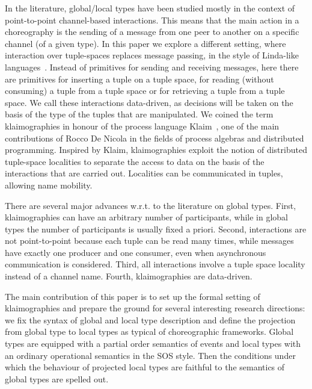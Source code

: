 In the literature, global/local types have been studied mostly in the
context of point-to-point channel-based interactions. This means that
the main action in a choreography is the sending of a message from one
peer to another on a specific channel (of a given type). In this paper we
explore a different setting, where interaction over tuple-spaces
replaces message passing, in the style of Linda-like
languages~\cite{DBLP:journals/toplas/Gelernter85}.  Instead of
primitives for sending and receiving messages, here there are
primitives for inserting a tuple on a tuple space, for reading
(without consuming) a tuple from a tuple space or for retrieving a
tuple from a tuple space. We call these interactions data-driven, as
decisions will be taken on the basis of the type of the tuples that
are manipulated. We coined the term klaimographies in honour of the
process language Klaim~\cite{DBLP:journals/tse/NicolaFP98,klaim}, one
of the main contributions of Rocco De Nicola in the fields of process
algebras and distributed programming. Inspired by Klaim,
klaimographies exploit the notion of distributed tuple-space
localities to separate the access to data on the basis of the
interactions that are carried out. Localities can be communicated in
tuples, allowing name mobility.

There are several major advances w.r.t. to the literature on global types.
First, klaimographies can have an arbitrary number of participants, while in global types the number of participants is usually fixed a priori.
Second, interactions are not point-to-point because each tuple can be read many times, while messages have exactly one producer and one consumer, even when asynchronous communication is considered.
Third, all interactions involve a tuple space locality instead of a channel name.
Fourth, klaimographies are data-driven.

The main contribution of this paper is to set up the formal setting of klaimographies and prepare the ground for several interesting research directions: we fix the syntax of global and local type description and define the projection from global type to local types as typical of choreographic frameworks.
Global types are equipped with a partial order semantics of events and local types with an ordinary operational semantics in the SOS style. Then the conditions under which the behaviour of projected local types are faithful to the semantics of global types are spelled out. 

